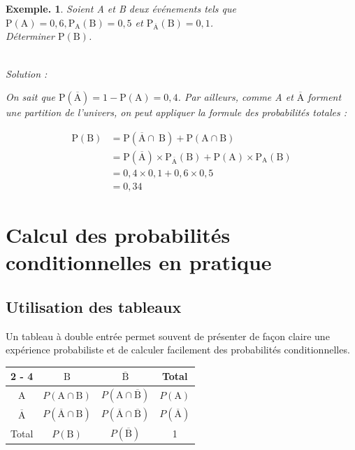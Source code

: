 \documentclass[12pt]{article}
\theoremstyle{break}
\newtheorem*{example}{Exemple.}
\begin{document}
\begin{example}
Soient A et B deux événements tels que $\mathrm{P}(\mathrm{A})=0,6, \mathrm{P}_{\mathrm{A}}(\mathrm{B})=0,5$ et $\mathrm{P}_{\overline{\mathrm{A}}}(\mathrm{B})=0,1$.\\
Déterminer $\mathrm{P}(\mathrm{B})$.

~\\Solution :

On sait que $\mathrm{P}(\overline{\mathrm{A}})=1-\mathrm{P}(\mathrm{A})=0,4$. Par ailleurs, comme A et $\overline{\mathrm{A}}$ forment une partition de l'univers, on peut appliquer la formule des probabilités totales :

$$
\begin{aligned}
\mathrm{P}(\mathrm{B}) & =\mathrm{P}(\overline{\mathrm{A}} \cap \mathrm{~B})+\mathrm{P}(\mathrm{A} \cap \mathrm{B}) \\
& =\mathrm{P}(\overline{\mathrm{A}}) \times \mathrm{P}_{\overline{\mathrm{A}}}(\mathrm{B})+\mathrm{P}(\mathrm{A}) \times \mathrm{P}_{\mathrm{A}}(\mathrm{B}) \\
& =0,4 \times 0,1+0,6 \times 0,5 \\
& =0,34
\end{aligned}
$$
\end{example}

\section{Calcul des probabilités conditionnelles en pratique}
\subsection{Utilisation des tableaux}
Un tableau à double entrée permet souvent de présenter de façon claire une expérience probabiliste et de calculer facilement des probabilités conditionnelles.

\begin{center}
\renewcommand{\arraystretch}{1.5}
\begin{tabular}{|c|c|c|c|}
\cline { 2 - 4 }
\multicolumn{1}{c|}{} & $\mathrm{B}$ & $\overline{\mathrm{B}}$ & Total \\
\hline
$\mathrm{A}$ & $P(\mathrm{A} \cap \mathrm{B})$ & $P(\mathrm{A} \cap \overline{\mathrm{B}})$ & $P(\mathrm{A})$ \\
\hline
$\overline{\mathrm{A}}$ & $P(\overline{\mathrm{A}} \cap \mathrm{B})$ & $P(\overline{\mathrm{A}} \cap \overline{\mathrm{B}})$ & $P(\overline{\mathrm{A}})$ \\
\hline
Total & $P(\mathrm{B})$ & $P(\overline{\mathrm{B}})$ & 1 \\
\hline
\end{tabular}
\end{center}
\end{document}

